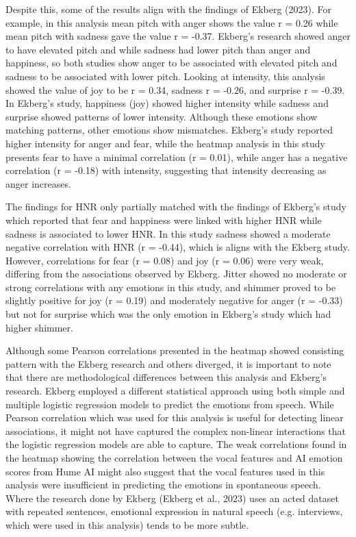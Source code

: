 Despite this, some of the results align with the findings of Ekberg (2023). 
For example, in this analysis mean pitch with anger shows the value r = 0.26 while mean pitch with sadness gave the value r = -0.37. Ekberg’s research showed anger to have elevated pitch and while sadness had lower pitch than anger and happiness, so both studies show anger to be associated with elevated pitch and sadness to be associated with lower pitch.
Looking at intensity, this analysis showed the value of joy to be r = 0.34, sadness r = -0.26, and surprise r = -0.39. In Ekberg’s study, happiness (joy) showed higher intensity while sadness and surprise showed patterns of lower intensity. Although these emotions show matching patterns, other emotions show mismatches. Ekberg’s study reported higher intensity for anger and fear, while the heatmap analysis in this study presents fear to have a minimal correlation (r = 0.01), while anger has a negative correlation (r = -0.18) with intensity, suggesting that intensity decreasing as anger increases.

The findings for HNR only partially matched with the findings of Ekberg’s study which reported that fear and happiness were linked with higher HNR while sadness is associated to lower HNR. 
In this study sadness showed a moderate negative correlation with HNR (r = -0.44), which is aligns with the Ekberg study. However, correlations for fear (r = 0.08) and joy (r = 0.06) were very weak, differing from the associations observed by Ekberg.
Jitter showed no moderate or strong correlations with any emotions in this study, and shimmer proved to be slightly positive for joy (r = 0.19) and moderately negative for anger (r = -0.33) but not for surprise which was the only emotion in Ekberg’s study which had higher shimmer.

Although some Pearson correlations presented in the heatmap showed consisting pattern with the Ekberg research and others diverged, it is important to note that there are methodological differences between this analysis and Ekberg’s research. Ekberg employed a different statistical approach using both simple and multiple logistic regression models to predict the emotions from speech. While Pearson correlation which was used for this analysis is useful for detecting linear associations, it might not have captured the complex non-linear interactions that the logistic regression models are able to capture.
The weak correlations found in the heatmap showing the correlation between the vocal features and AI emotion scores from Hume AI might also suggest that the vocal features used in this analysis were insufficient in predicting the emotions in spontaneous speech. Where the research done by Ekberg (Ekberg et al., 2023) uses an acted dataset with repeated sentences, emotional expression in natural speech (e.g. interviews, which were used in this analysis) tends to be more subtle.

